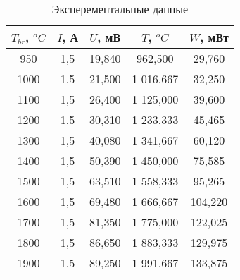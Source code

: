 \begin{table}[h!]
    \centering
    \begin{tabular}{|c|c|c|c|c|}
    \hline
    $T_{br}$, $^oC$   & $I$, А    & $U$, мВ     & $T$, $^oC$         & $W$, мВт       \\ \hline
    950               & 1,5       & 19,840      & 962,500            & 29,760         \\ \hline
    1000              & 1,5       & 21,500      & 1 016,667          & 32,250         \\ \hline
    1100              & 1,5       & 26,400      & 1 125,000          & 39,600         \\ \hline
    1200              & 1,5       & 30,310      & 1 233,333          & 45,465         \\ \hline
    1300              & 1,5       & 40,080      & 1 341,667          & 60,120         \\ \hline
    1400              & 1,5       & 50,390      & 1 450,000          & 75,585         \\ \hline
    1500              & 1,5       & 63,510      & 1 558,333          & 95,265         \\ \hline
    1600              & 1,5       & 69,480      & 1 666,667          & 104,220        \\ \hline
    1700              & 1,5       & 81,350      & 1 775,000          & 122,025        \\ \hline
    1800              & 1,5       & 86,650      & 1 883,333          & 129,975        \\ \hline
    1900              & 1,5       & 89,250      & 1 991,667          & 133,875        \\ \hline
    \end{tabular}
    \caption{Эксперементальные данные}
    \label{table:1}
\end{table}
